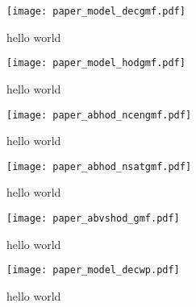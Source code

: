 \documentclass[14pt, preprint]{emulateapj}
\begin{document}
\begin{figure*}
\begin{center}
\texttt{[image: paper\_model\_decgmf.pdf]}
\caption{hello world}
\label{fig:abc_converge}
\end{center}
\end{figure*}
\begin{figure*}
\begin{center}
\texttt{[image: paper\_model\_hodgmf.pdf]}
\caption{hello world}
\label{fig:abc_converge}
\end{center}
\end{figure*}
\begin{figure*}
\begin{center}
\texttt{[image: paper\_abhod\_ncengmf.pdf]}
\caption{hello world}
\label{fig:abc_converge}
\end{center}
\end{figure*}
\begin{figure*}
\begin{center}
\texttt{[image: paper\_abhod\_nsatgmf.pdf]}
\caption{hello world}
\label{fig:abc_converge}
\end{center}
\end{figure*}
\begin{figure*}
\begin{center}
\texttt{[image: paper\_abvshod\_gmf.pdf]}
\caption{hello world}
\label{fig:abc_converge}
\end{center}
\end{figure*}
\begin{figure*}
\begin{center}
\texttt{[image: paper\_model\_decwp.pdf]}
\caption{hello world}
\label{fig:abc_converge}
\end{center}
\end{figure*}
\end{document}
